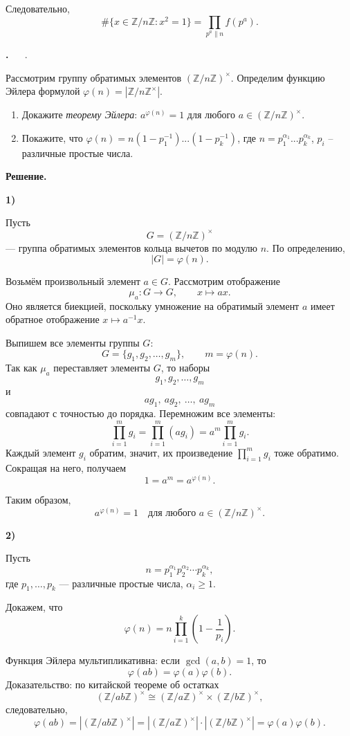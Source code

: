 \documentclass[12pt,a4paper]{article}
\newcounter{task}                   %
\newenvironment{task}[1][]{%
  \refstepcounter{task}%
  \par\vspace{0.3\baselineskip}%
  \noindent\textbf{\thetask.}%
  \if\relax\detokenize{#1}\relax   %
    \ \ignorespaces                 %
  \else
    \ \textbf{#1}.\ \ignorespaces   %
  \fi
}{%
  \par\vspace{0.2\baselineskip}%
}
\newcommand{\sol}{%
  \par\vspace{0.3\baselineskip}%
  \noindent\textbf{Решение.}\ %
  \ignorespaces                     %
}
\newcommand{\soli}[1]{%
  \par\vspace{0.15\baselineskip}%
  \noindent\textbf{#1)}\ %
  \ignorespaces                     %
}
\begin{document}
Следовательно,
\[
\boxed{
\#\{x\in\mathbb Z/n\mathbb Z:x^2=1\}
=
\prod_{p^a\parallel n}f(p^a)
}.
\]

\begin{task}
    Рассмотрим группу обратимых элементов $(\mathbb{Z}/n \mathbb{Z})^\times$. Определим функцию Эйлера формулой $\varphi(n) = | \mathbb{Z}/n \mathbb{Z}^\times |$.
    \begin{enumerate}
	\item Докажите \textit{теорему Эйлера}: $a^{\varphi(n)} = 1$ для любого $a \in (\mathbb{Z}/n \mathbb{Z})^\times$.

	\item Покажите, что $\varphi (n) = n (1 - p_1^{-1}) ... (1 - p_k^{-1})$, где $n = p_1^{\alpha_1} ... p_k^{\alpha_k}$, $p_i$ -- различные простые числа.
    \end{enumerate}
\end{task}

\sol
\soli{1}

Пусть 
\[
G=(\mathbb Z/n\mathbb Z)^\times
\]
— группа обратимых элементов кольца вычетов по модулю $n$. По определению,
\[
|G|=\varphi(n).
\]

Возьмём произвольный элемент $a\in G$. Рассмотрим отображение
\[
\mu_a\colon G\to G,\qquad x\mapsto ax.
\]
Оно является биекцией, поскольку умножение на обратимый элемент $a$ имеет обратное отображение $x\mapsto a^{-1}x$.

Выпишем все элементы группы $G$:
\[
G=\{g_1,g_2,\dots,g_m\},\qquad m=\varphi(n).
\]
Так как $\mu_a$ переставляет элементы $G$, то наборы
\[
g_1,g_2,\dots,g_m
\]
и
\[
a g_1,\ a g_2,\ \dots,\ a g_m
\]
совпадают с точностью до порядка. Перемножим все элементы:
\[
\prod_{i=1}^m g_i
=
\prod_{i=1}^m (a g_i)
=
a^m \prod_{i=1}^m g_i.
\]
Каждый элемент $g_i$ обратим, значит, их произведение $\prod_{i=1}^m g_i$ тоже обратимо. Сокращая на него, получаем
\[
1=a^m=a^{\varphi(n)}.
\]

Таким образом,
\[
\boxed{a^{\varphi(n)}=1 \quad \text{для любого } a\in (\mathbb Z/n\mathbb Z)^\times.}
\]

\soli{2}

Пусть
\[
n = p_1^{\alpha_1} p_2^{\alpha_2} \cdots p_k^{\alpha_k},
\]
где $p_1,\dots,p_k$ — различные простые числа, $\alpha_i \ge 1$.

Докажем, что
\[
\varphi(n) = n \prod_{i=1}^{k} \left(1 - \frac{1}{p_i}\right).
\]

Функция Эйлера мультипликативна: если $\gcd(a,b)=1$, то
\[
\varphi(ab) = \varphi(a)\varphi(b).
\]
Доказательство: по китайской теореме об остатках
\[
(\mathbb Z/ab\mathbb Z)^\times \cong (\mathbb Z/a\mathbb Z)^\times \times (\mathbb Z/b\mathbb Z)^\times,
\]
следовательно,
\[
\varphi(ab) = |(\mathbb Z/ab\mathbb Z)^\times| = |(\mathbb Z/a\mathbb Z)^\times| \cdot |(\mathbb Z/b\mathbb Z)^\times| = \varphi(a)\varphi(b).
\]
\end{document}
